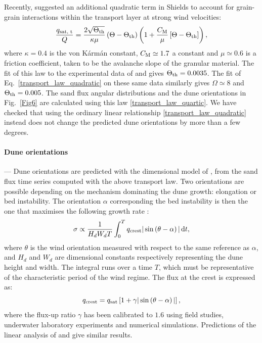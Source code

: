 Recently, \citet{Pahtz2020} suggested an additional quadratic term in Shields to account for grain-grain interactions within the transport layer at strong wind velocities:
%
\begin{equation}
\label{transport_law_quartic}
\frac{q_{\textup{sat, t}}}{Q} = \frac{2\sqrt{\Theta_{\textup{th}}}}{\kappa\mu}\left(\Theta - \Theta_{\textup{th}}\right)\left(1 +\frac{C_{\textup{M}}}{\mu}\left[\Theta - \Theta_{\textup{th}}\right]\right),
\end{equation}
%
where $\kappa = 0.4$ is the von K\'arm\'an constant, $C_{\rm M} \simeq 1.7$ a constant and $\mu \simeq 0.6$ is a friction coefficient, taken to be the avalanche slope of the granular material. The fit of this law to the experimental data of \citet{Creyssels2009} and \citet{Ho2011} gives $\Theta_{\textup{th}} = 0.0035$. The fit of Eq.~\ref{transport_law_quadratic} on these same data similarly gives $\Omega \simeq 8$ and $\Theta_{\textup{th}} = 0.005$. The sand flux angular distributions and the dune orientations in Fig.~\ref{Fig6} are calculated using this law \eqref{transport_law_quartic}. We have checked that using the ordinary linear relationship \eqref{transport_law_quadratic} instead does not change the predicted dune orientations by more than a few degrees.

\paragraph{Dune orientations} ---
Dune orientations are predicted with the dimensional model of \citet{Courrech2014}, from the sand flux time series computed with the above transport law. Two orientations are possible depending on the mechanism dominating the dune growth: elongation or bed instability. The orientation $\alpha$ corresponding the bed instability is then the one that maximises the following growth rate \citep{Rubin1987}:
%
\begin{equation}
\sigma \propto \frac{1}{H_{d} W_{d} T}\int_0^T  q_{\textup{crest}}\vert \sin\left(\theta - \alpha\right) \vert \, \textup{d}t,
\end{equation}
%
where $\theta$ is the wind orientation measured with respect to the same reference as $\alpha$, and $H_{d}$ and $W_{d}$ are dimensional constants respectively representing the dune height and width. The integral runs over a time $T$, which must be representative of the characteristic period of the wind regime. The flux at the crest is expressed as:
%
\begin{equation}
q_{\textup{crest}} = q_{\textup{sat}}\left[1 + \gamma\vert\sin\left(\theta - \alpha\right)\vert\right],
\end{equation}
%
where the flux-up ratio $\gamma$ has been calibrated to $1.6$ using field studies, underwater laboratory experiments and numerical simulations. Predictions of the linear analysis of \citet{Gadal2019} and \citet{Delorme2020} give similar results.

